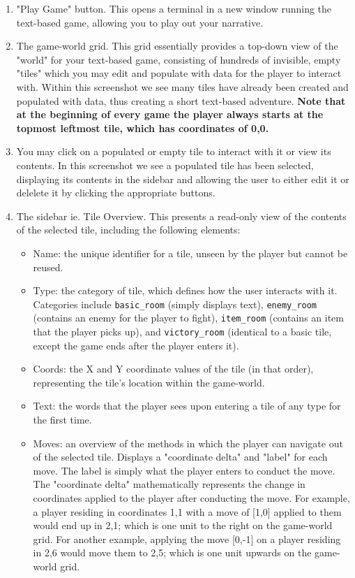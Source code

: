 \documentclass{article} \usepackage[margin=1in,headheight=57pt,headsep=0.1in]{geometry}
\begin{document}
\begin{enumerate}
	\item "Play Game" button. This opens a terminal in a new window running the text-based game, allowing you to play out your narrative.
	\item The game-world grid. This grid essentially provides a top-down view of the "world" for your text-based game, consisting of hundreds of invisible, empty "tiles" which you may edit and populate with data for the player to interact with. Within this screenshot we see many tiles have already been created and populated with data, thus creating a short text-based adventure. \textbf{Note that at the beginning of every game the player always starts at the topmost leftmost tile, which has coordinates of 0,0.}
	\item You may click on a populated or empty tile to interact with it or view its contents. In this screenshot we see a populated tile has been selected, displaying its contents in the sidebar and allowing the user to either edit it or delelete it by clicking the appropriate buttons.
	\item The sidebar ie. Tile Overview. This presents a read-only view of the contents of the selected tile, including the following elements:
		\begin{itemize}
			\item Name: the unique identifier for a tile, unseen by the player but cannot be reused.
			\item Type: the category of tile, which defines how the user interacts with it. Categories include \texttt{basic\_room} (simply displays text), \texttt{enemy\_room} (contains an enemy for the player to fight), \texttt{item\_room} (contains an item that the player picks up), and \texttt{victory\_room} (identical to a basic tile, except the game ends after the player enters it).
			\item Coords: the X and Y coordinate values of the tile (in that order), representing the tile's location within the game-world.
			\item Text: the words that the player sees upon entering a tile of any type for the first time.
			\item Moves: an overview of the methods in which the player can navigate out of the selected tile. Displays a "coordinate delta" and "label" for each move. The label is simply what the player enters to conduct the move. The "coordinate delta" mathematically represents the change in coordinates applied to the player after conducting the move. For example, a player residing in coordinates 1,1 with a move of [1,0] applied to them would end up in 2,1; which is one unit to the right on the game-world grid. For another example, applying the move [0,-1] on a player residing in 2,6 would move them to 2,5; which is one unit upwards on the game-world grid.

\end{itemize}
\end{enumerate}
\end{document}

